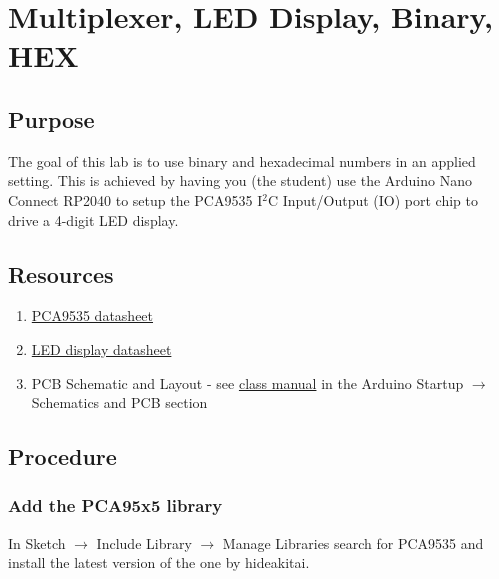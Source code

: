 \chapter{Multiplexer, LED Display, Binary, HEX}

\section{Purpose}
The goal of this lab is to use binary and hexadecimal numbers in an applied setting. This is 
achieved by having you (the student) use the Arduino Nano Connect RP2040 to setup the 
PCA9535 I$^2$C Input/Output (IO) port chip to drive a 4-digit LED display.

\section{Resources}\label{sec:resources}
\begin{enumerate}
    \item \href{https://www.nxp.com/products/interfaces/ic-spi-i3c-interface-devices/general-purpose-i-o-gpio/16-bit-ic-bus-and-smbus-low-power-i-o-port-with-interrupt:PCA9535_PCA9535C}{PCA9535 datasheet}
    \item \href{https://datasheet.lcsc.com/lcsc/1810191633_SUNLIGHT-SLR0394FG3C5BD-3-5_C225905.pdf}{LED display datasheet}
    \item PCB Schematic and Layout - see 
            \href{https://github.com/semcneil/Fundamentals-of-Microcontrollers-Manual}{class manual} 
            in the Arduino Startup $\rightarrow$ Schematics and PCB section
\end{enumerate}

\section{Procedure}
\subsection{Add the PCA95x5 library}
In Sketch $\rightarrow$ Include Library $\rightarrow$ Manage Libraries search for 
PCA9535 and install the latest version of the one by hideakitai.

